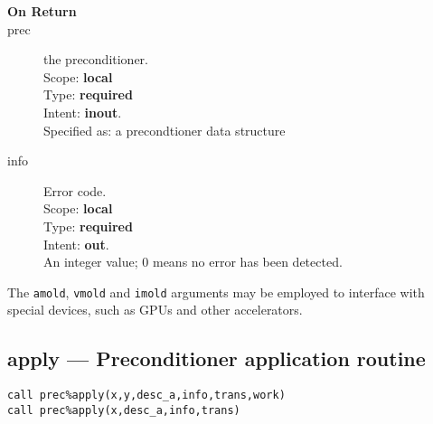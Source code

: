 \begin{description}
\item[\bf On Return]
\item[prec] the preconditioner.\\
Scope: {\bf local} \\
Type: {\bf required}\\
Intent: {\bf inout}.\\
Specified as: a precondtioner data structure \precdata\\
\item[info] Error code.\\
Scope: {\bf local} \\
Type: {\bf required} \\
Intent: {\bf out}.\\
An integer value; 0 means no error has been detected. 
\end{description}
The \verb|amold|, \verb|vmold| and \verb|imold|  arguments may be
employed to interface with special devices, such as GPUs and other
accelerators. 



\clearpage\subsection{apply --- Preconditioner application
  routine}

\begin{verbatim}
call prec%apply(x,y,desc_a,info,trans,work)
call prec%apply(x,desc_a,info,trans)
\end{verbatim}

